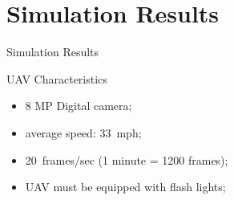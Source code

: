 \section{Simulation Results}

\begin{frame}{Simulation Results}
    \begin{block}{UAV Characteristics}
        \begin{itemize}
            \item 8 MP Digital camera;
            \item average speed: \SI{33}{mph};
            \item \SI{20}{frames/sec} (1 minute = 1200 frames);   
            \item UAV must be equipped with flash lights;
        \end{itemize}
    \end{block}
\end{frame}

